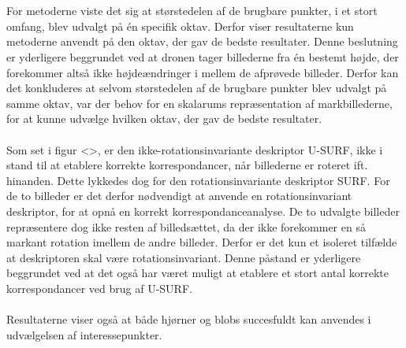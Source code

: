 \\ \\
For metoderne viste det sig at størstedelen af de brugbare punkter, i et stort omfang, blev udvalgt på én specifik oktav. Derfor viser resultaterne kun metoderne anvendt på den oktav, der gav de bedste resultater. Denne beslutning er yderligere beggrundet ved at dronen tager billederne fra én bestemt højde, der forekommer altså ikke højdeændringer i mellem de afprøvede billeder. Derfor kan det konkluderes at selvom størstedelen af de brugbare punkter blev udvalgt på samme oktav, var der behov for en skalarums repræsentation af markbillederne, for at kunne udvælge hvilken oktav, der gav de bedste resultater.
\\ \\
Som set i figur <>, er den ikke-rotationsinvariante deskriptor U-SURF, ikke i stand til at etablere korrekte korrespondancer, når billederne er roteret ift. hinanden. Dette lykkedes dog for den rotationsinvariante deskriptor SURF. For de to billeder er det derfor nødvendigt at anvende en rotationsinvariant deskriptor, for at opnå en korrekt korrespondanceanalyse. De to udvalgte billeder repræsentere dog ikke resten af billedsættet, da der ikke forekommer en så markant rotation imellem de andre billeder. Derfor er det kun et isoleret tilfælde at deskriptoren skal være rotationsinvariant. Denne påstand er yderligere beggrundet ved at det også har været muligt at etablere et stort antal korrekte korrespondancer ved brug af U-SURF.
\\ \\
Resultaterne viser også at både hjørner og blobs succesfuldt kan anvendes i udvælgelsen af interessepunkter.
